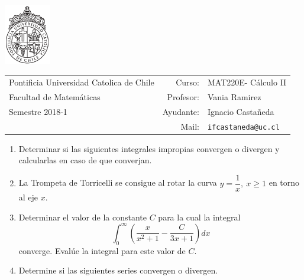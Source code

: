 \documentclass[12pt]{article}
\newenvironment{preguntas}
{\begin{enumerate}\itemsep12pt
	}
	{
	\end{enumerate}
}
\newcommand{\sigla}{MAT220E}
\newcommand{\nombre}{Cálculo II}
\newcommand{\profesor}{Vania Ramirez}
\newcommand{\ano}{2018}
\newcommand{\semestre}{1}
\begin{document}
\thispagestyle{empty}

\begin{minipage}{2cm}
	\includegraphics[width=2cm]{../../../../img/logo.pdf}
	\vspace{0.5cm}
\end{minipage}
\begin{minipage}{\linewidth}
	\begin{tabular}{lrl}
		{\scriptsize\sc Pontificia Universidad Catolica de Chile} & \hspace*{0.7in}Curso: &
		\sigla - \nombre\\
		{\sc Facultad de Matemáticas}&
		Profesor: & \profesor \\
		{\sc Semestre \ano-\semestre} & Ayudante: & {Ignacio Castañeda}\\
		& {Mail:} & \texttt{ifcastaneda@uc.cl}
	\end{tabular}
\end{minipage}

\begin{preguntas}
\item Determinar si las siguientes integrales impropias convergen o divergen y calcularlas en caso de que converjan.
\item La Trompeta de Torricelli se consigue al rotar la curva $y=\dfrac{1}{x},\ x \geq 1$ en torno al eje $x$.
\item Determinar el valor de la constante $C$ para la cual la integral
	$$\displaystyle\int_{0}^{\infty} \left( \dfrac{x}{x^2+1} - \dfrac{C}{3x+1}\right)dx$$
	converge. Evalúe la integral para este valor de $C$.
\item Determine si las siguientes series convergen o divergen.
\end{preguntas}
\end{document}
